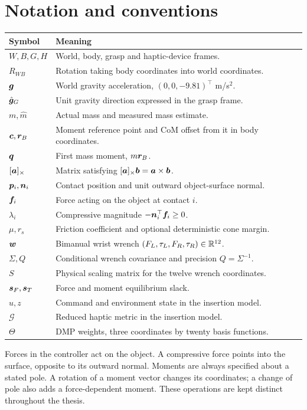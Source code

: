 \chapter*{Notation and conventions}
\begin{longtable}{@{}p{}p{}@{}}
\toprule Symbol & Meaning \\
\midrule\endhead
$W,B,G,H$ & World, body, grasp and haptic-device frames.\\
$R_{WB}$ & Rotation taking body coordinates into world coordinates.\\
$\bm{g}$ & World gravity acceleration, $(0,0,-9.81)^\top$ m/s$^2$.\\
$\hat{\bm{g}}_G$ & Unit gravity direction expressed in the grasp frame.\\
$m,\hat m$ & Actual mass and measured mass estimate.\\
$\bm{c},\bm{r}_B$ & Moment reference point and CoM offset from it in body coordinates.\\
$\bm{q}$ & First mass moment, $m\bm{r}_B$.\\
$[\bm{a}]_{\times}$ & Matrix satisfying $[\bm{a}]_{\times}\bm{b}=\bm{a}\times\bm{b}$.\\
$\bm{p}_i,\bm{n}_i$ & Contact position and unit outward object-surface normal.\\
$\bm{f}_i$ & Force acting on the object at contact $i$.\\
$\lambda_i$ & Compressive magnitude $-\bm{n}_i^\top\bm{f}_i\geq0$.\\
$\mu,r_s$ & Friction coefficient and optional deterministic cone margin.\\
$\bm{w}$ & Bimanual wrist wrench $(F_L,\tau_L,F_R,\tau_R)\in\mathbb{R}^{12}$.\\
$\Sigma,Q$ & Conditional wrench covariance and precision $Q=\Sigma^{-1}$.\\
$S$ & Physical scaling matrix for the twelve wrench coordinates.\\
$\bm{s}_F,\bm{s}_T$ & Force and moment equilibrium slack.\\
$u,z$ & Command and environment state in the insertion model.\\
$\mathcal G$ & Reduced haptic metric in the insertion model.\\
$\Theta$ & DMP weights, three coordinates by twenty basis functions.\\
\bottomrule
\end{longtable}
Forces in the controller act on the object. A compressive force points into the surface, opposite to its outward normal. Moments are always specified about a stated pole. A rotation of a moment vector changes its coordinates; a change of pole also adds a force-dependent moment. These operations are kept distinct throughout the thesis.

